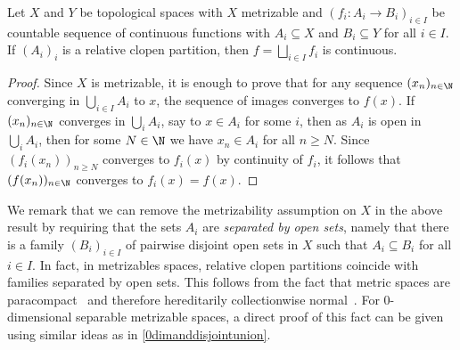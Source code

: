 \begin{lemma}\label{lem:ContUnion}
Let $X$ and $Y$ be topological spaces with $X$ metrizable and $(f_i:A_i\to B_i)_{i\in I}$ be countable sequence of continuous functions with $A_i\subseteq X$ and $B_i\subseteq Y$ for all $i\in I$.
If $(A_i)_i$ is a relative clopen partition, then $f=\bigsqcup_{i\in I} f_i$ is continuous.
\end{lemma}
\begin{proof}
Since $X$ is metrizable, it is enough to prove that for any sequence $(x_n)_{n\in\N}$ converging in $\bigcup_{i\in I}A_i$ to $x$, the sequence of images converges to $f(x)$.
If $(x_n)_{n\in\N}$ converges in $\bigcup_i A_i$, say to $x\in A_i$ for some $i$,
then as $A_i$ is open in $\bigcup_i A_i$, then for some $N\in\N$ we have $x_n\in A_i$ for all $n\geq N$. Since $(f_i(x_n))_{n\geq N}$ converges to $f_i(x)$ by continuity of $f_i$, it follows that $(f(x_n))_{n\in\N}$ converges to $f_i(x)=f(x)$.
\end{proof}

We remark that we can remove the metrizability assumption on $X$ in the above result by requiring that the sets $A_i$ are \emph{separated by open sets}, namely that
there is a family $(B_i)_ {i\in I}$ of pairwise disjoint open sets in $X$ such that $A_i\subseteq B_i$ for all $i\in I$. 
In fact, in metrizables spaces, relative clopen partitions coincide with families separated by open sets. This follows from the fact that metric spaces are paracompact~\cite{rudin1969new} and therefore hereditarily collectionwise normal~\cite[Theorem 5.1.18 and Problem 5.5.1]{engelking}.
For $0$-dimensional separable metrizable spaces, a direct proof of this fact can be given using similar ideas as in \cref{0dimanddisjointunion}.

